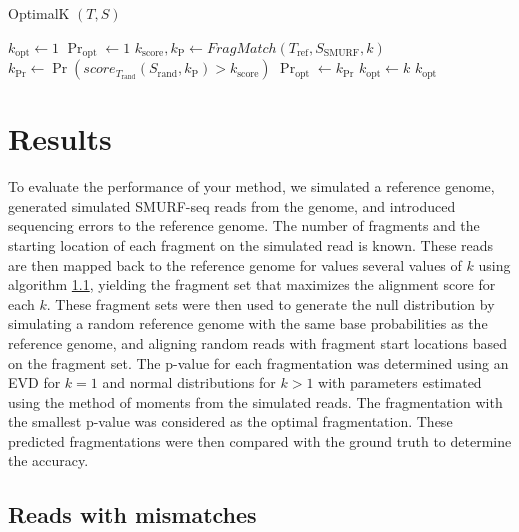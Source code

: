 \begin{algorithm}[H]
\caption{OptimalK $(T,S)$}
\begin{algorithmic}[1]
  \STATE $k_\mathrm{opt} \leftarrow 1$
  \STATE $\Pr_\mathrm{opt} \leftarrow 1$
    \STATE $k_\mathrm{score}, k_\mathrm{P} \leftarrow
              FragMatch(T_\mathrm{ref},S_\mathrm{SMURF},k)$
    \STATE $k_{\Pr} \leftarrow \Pr(score_{T_\mathrm{rand}}
              (S_\mathrm{rand},k_\mathrm{P}) > k_\mathrm{score})$
      \STATE $\Pr_\mathrm{opt} \leftarrow k_{\Pr}$
      \STATE $k_\mathrm{opt} \leftarrow k$
    \ENDIF
  \ENDFOR
  \RETURN $k_\mathrm{opt}$
\end{algorithmic}
\end{algorithm}




\section{Results}
To evaluate the performance of your method, we simulated a reference
genome, generated simulated SMURF-seq reads from the genome, and
introduced sequencing errors to the reference genome. The number of
fragments and the starting location of each fragment on the simulated
read is known. These reads are then mapped back to the reference genome
for values several values of $k$ using algorithm \ref{}, yielding the
fragment set that maximizes the alignment score for each $k$. These
fragment sets were then used to generate the null distribution by
simulating a random reference genome with the same base probabilities
as the reference genome, and aligning random reads with fragment start
locations based on the fragment set. The p-value for each fragmentation
was determined using an EVD for $k=1$ and normal distributions for $k >
1$ with parameters estimated using the method of moments from the
simulated reads. The fragmentation with the smallest p-value was considered
as the optimal fragmentation. These predicted fragmentations were then
compared with the ground truth to determine the accuracy.


\subsection{Reads with mismatches}

